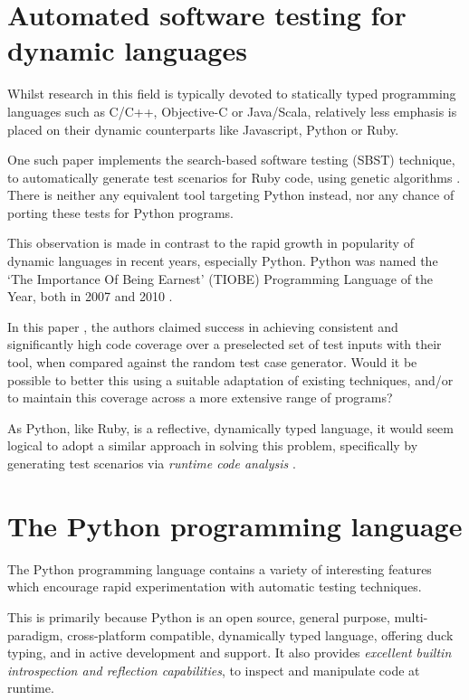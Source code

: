 \section{Automated software testing for dynamic languages}
Whilst research in this field is typically devoted to statically typed programming languages such as C/C++, Objective-C or Java/Scala, relatively less emphasis is placed on their dynamic counterparts like Javascript, Python or Ruby.

One such paper implements the search-based software testing (SBST) technique, to automatically generate test scenarios for Ruby code, using genetic algorithms \cite{Mairhofer2011}. There is neither any equivalent tool targeting Python instead, nor any chance of porting these tests for Python programs.

This observation is made in contrast to the rapid growth in popularity of dynamic languages in recent years, especially Python. Python was named the `The Importance Of Being Earnest' (TIOBE) Programming Language of the Year, both in 2007 and 2010 \cite{TiobeDec11}.

In this paper \cite{Mairhofer2011}, the authors claimed success in achieving consistent and significantly high code coverage over a preselected set of test inputs with their tool, when compared against the \naive random test case generator. Would it be possible to better this using a suitable adaptation of existing techniques, and/or to maintain this coverage across a more extensive range of programs?

As Python, like Ruby, is a reflective, dynamically typed language, it would seem logical to adopt a similar approach in solving this problem, specifically by generating test scenarios via \emph{runtime code analysis} \cite{Mairhofer2011}.
\section{The Python programming language}
The Python programming language contains a variety of interesting features which encourage rapid experimentation with automatic testing techniques.

This is primarily because Python is an open source, general purpose, multi-paradigm, cross-platform compatible, dynamically typed language, offering duck typing, and in active development and support. It also provides \emph{excellent builtin introspection and reflection capabilities}, to inspect and manipulate code at runtime.


